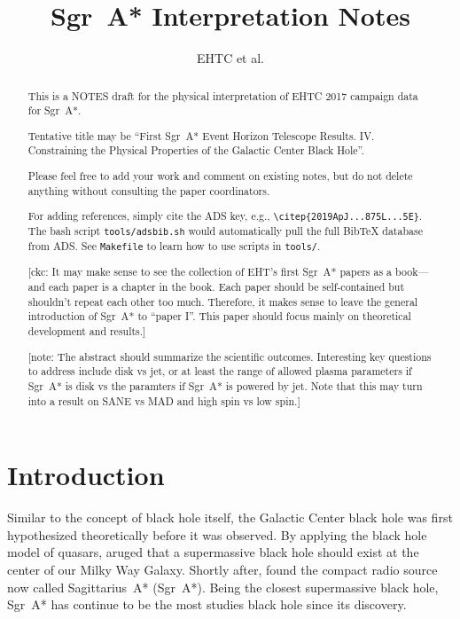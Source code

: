 \documentclass[twocolumn,tighten,dvipsnames]{aastex63}
\newcommand\sgra{Sgr~A*\xspace}
\newcommand\<{{\langle}}
\renewcommand\>{{\rangle}} %
\newcommand\note[1]{{\color{OliveGreen}[note: #1]}}
\newcommand\ckc[1]{{\color{MidnightBlue}[ckc: #1]}}
\begin{document}
\title{\sgra Interpretation Notes}
\author{EHTC et al.}

\shorttitle{\sgra Interpretation}

\revised{\today}

\begin{abstract}
  \color{BrickRed}

  This is a NOTES draft for the physical interpretation of EHTC 2017
  campaign data for \sgra.

  Tentative title may be ``First \sgra Event Horizon Telescope
  Results. IV. Constraining the Physical Properties of the Galactic
  Center Black Hole''.

  Please feel free to add your work and comment on existing notes, but
  do not delete anything without consulting the paper coordinators.

  For adding references, simply cite the ADS key, e.g.,
  \texttt{\textbackslash citep\{2019ApJ...875L...5E\}}.
  The bash script \texttt{tools/adsbib.sh} would automatically pull
  the full BibTeX database from ADS.
  See \texttt{Makefile} to learn how to use scripts in
  \texttt{tools/}.

  \ckc{It may make sense to see the collection of EHT's first \sgra
    papers as a book---and each paper is a chapter in the book.
    Each paper should be self-contained but shouldn't repeat each
    other too much.
    Therefore, it makes sense to leave the general introduction of
    \sgra to ``paper I''.
    This paper should focus mainly on theoretical development and
    results.}

  \note{The abstract should summarize the scientific outcomes.
    Interesting key questions to address include disk vs jet, or at
    least the range of allowed plasma parameters if \sgra is disk vs
    the paramters if \sgra is powered by jet.
    Note that this may turn into a result on SANE vs MAD and high spin
    vs low spin.}
\end{abstract}


\section{Introduction}
\label{sec:intro}

Similar to the concept of black hole itself, the Galactic Center black
hole was first hypothesized theoretically before it was observed.
By applying the black hole model of quasars,
\citet{1971MNRAS.152..461L} aruged that a supermassive black hole
should exist at the center of our Milky Way Galaxy.
Shortly after, \citet{1974ApJ...194..265B, 1975A&A....43..159E,
  1975ApJ...202L..63L} found the compact radio source now called
Sagittarius~A* (\sgra).
Being the closest supermassive black hole, \sgra has continue to be
the most studies black hole since its discovery.
\end{document}
